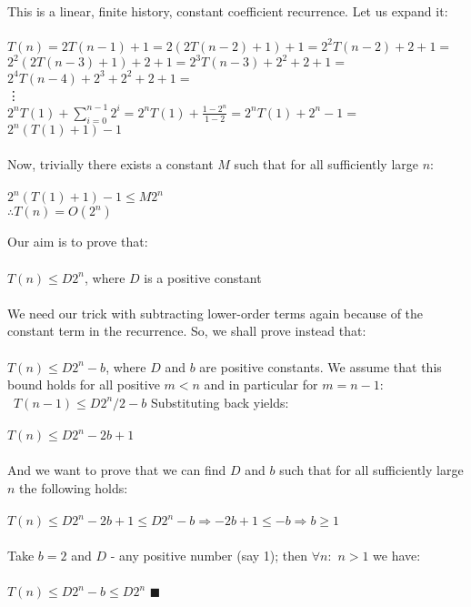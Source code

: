 \documentclass[a4paper]{article}
\begin{document}
\begin{itemize}
This is a linear, finite history, constant coefficient recurrence. Let us expand it:  \\ \\
$T(n) = 2T(n-1) + 1 = 2(2T(n-2)+1)+1 = 2^2T(n-2)+2+1 = $ \\
$2^2(2T(n-3)+1)+2+1 = 2^3T(n-3) + 2^2 + 2 + 1 = $ \\
$2^4T(n-4) + 2^3 + 2^2 + 2 + 1 = $ \\
\vdots \\
$2^nT(1) + \sum\limits_{i=0}^{n-1}2^i = 2^nT(1) + \frac{1-2^n}{1-2} = 2^nT(1) + 2^n - 1= $ \\
$2^n(T(1) + 1) - 1$ \\ \\
Now, trivially there exists a constant $M$ such that for all sufficiently large $n$: \\ \\
$2^n(T(1) + 1) - 1 \leq M2^n$ \\
$\therefore T(n) = O(2^n)$
 
Our aim is to prove that: \\ \\
$T(n) \leq D2^n$, where $D$ is a positive constant \\ \\
We need our trick with subtracting lower-order terms again because of the constant term in the recurrence. So, we shall prove instead that: \\ \\
$T(n) \leq D2^n - b$, where $D$ and $b$ are positive constants. We assume that this bound holds for all positive $m<n$ and in particular for $m = n-1$: \\ \
$T(n-1) \leq D2^n/2 - b$
Substituting back yields: \\ \\
$T(n) \leq D2^n - 2b + 1$ \\ \\
And we want to prove that we can find $D$ and $b$ such that for all sufficiently large $n$ the following holds: \\ \\
$T(n) \leq D2^n - 2b + 1 \leq D2^n - b \Rightarrow -2b +1 \leq -b \Rightarrow b \ge 1$ \\ \\
Take $b=2$ and $D$ - any positive number (say 1); then $\forall n:$ $n>1$ we have: \\ \\
$T(n) \leq D2^n - b \leq D2^n$
$\blacksquare$

	

\end{itemize}
\end{document}
